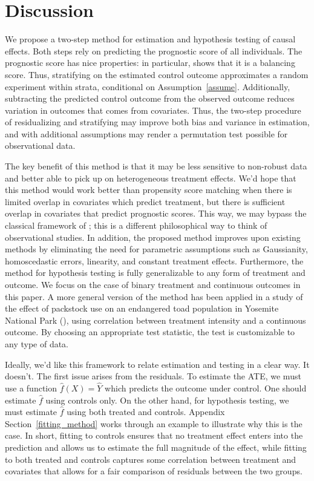 \documentclass[12pt]{article}
\begin{document}
\section{Discussion}
We propose a two-step method for estimation and hypothesis testing of causal effects.
Both steps rely on predicting the prognostic score of all individuals.
The prognostic score has nice properties: in particular, \citet{hansen_prognostic_2008} shows that it is a balancing score.
Thus, stratifying on the estimated control outcome approximates a random experiment within strata, conditional on Assumption~\ref{assume}.
Additionally, subtracting the predicted control outcome from the observed outcome reduces variation in outcomes that comes from covariates.
Thus, the two-step procedure of residualizing and stratifying may improve both bias and variance in estimation, and with additional assumptions may render a permutation test possible for observational data.

The key benefit of this method is that it may be less sensitive to non-robust data and better able to pick up on heterogeneous treatment effects.
We'd hope that this method would work better than propensity score matching when there is limited overlap in covariates which predict treatment, but there is sufficient overlap in covariates that predict prognostic scores.
This way, we may bypass the classical framework of \citet{rosenbaum_central_1983}; this is a different philosophical way to think of observational studies.
In addition, the proposed method improves upon existing methods by eliminating the need for parametric assumptions such as Gaussianity, homoscedastic errors, linearity, and constant treatment effects.  
Furthermore, the method for hypothesis testing is fully generalizable to any form of treatment and outcome.
We focus on the case of binary treatment and continuous outcomes in this paper.
A more general version of the method has been applied in a study of the effect of packstock use on an endangered toad population in Yosemite National Park (\citet{matchett_detecting_2015}),
using correlation between treatment intensity and a continuous outcome.
By choosing an appropriate test statistic, the test is customizable to any type of data.

Ideally, we'd like this framework to relate estimation and testing in a clear way.
It doesn't.
The first issue arises from the residuals.
To estimate the ATE, we must use a function $\hat{f}(X) = \hat{Y}$ which predicts the outcome under control.
One should estimate $\hat{f}$ using controls only.
On the other hand, for hypothesis testing, we must estimate $\hat{f}$ using both treated and controls. 
Appendix Section~\ref{fitting_method} works through an example to illustrate why this is the case.
In short, fitting to controls ensures that no treatment effect enters into the prediction and allows us to estimate the full magnitude of the effect,
while fitting to both treated and controls captures some correlation between treatment and covariates that allows for a fair comparison of residuals between the two groups.
\end{document}
